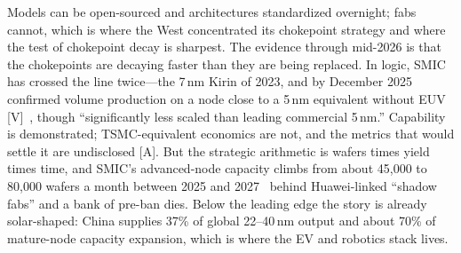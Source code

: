 Models can be open-sourced and architectures standardized overnight; fabs cannot, which is where the West concentrated its chokepoint strategy and where the test of chokepoint decay is sharpest. The evidence through mid-2026 is that the chokepoints are decaying faster than they are being replaced. In logic, SMIC has crossed the line twice---the 7\,nm Kirin of 2023, and by December 2025 confirmed volume production on a node close to a 5\,nm equivalent without EUV [V]~\cite{smic-5nm,techinsights-n3}, though ``significantly less scaled than leading commercial 5\,nm.'' Capability is demonstrated; TSMC-equivalent economics are not, and the metrics that would settle it are undisclosed [A]. But the strategic arithmetic is wafers times yield times time, and SMIC's advanced-node capacity climbs from about 45,000 to 80,000 wafers a month between 2025 and 2027~\cite{semianalysis-ascend} behind Huawei-linked ``shadow fabs'' and a bank of pre-ban dies. Below the leading edge the story is already solar-shaped: China supplies 37\% of global 22--40\,nm output and about 70\% of mature-node capacity expansion, which is where the EV and robotics stack lives.

